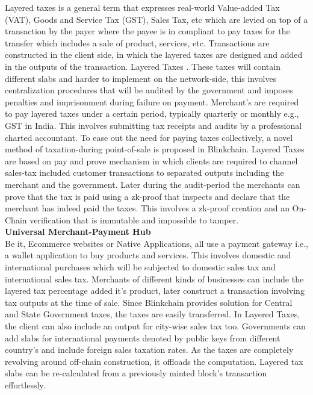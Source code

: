 \documentclass[letterpaper,11pt]{article}
\begin{document}
Layered taxes is a general term that expresses real-world Value-added Tax (VAT), Goods and Service Tax (GST), Sales Tax, etc which are levied on top of a transaction by the payer where the payee is in compliant to pay taxes for the transfer which includes a sale of product, services, etc. Transactions are constructed in the client side, in which the layered taxes are designed and added in the outputs of the transaction. Layered Taxes . These taxes will contain different slabs and harder to implement on the network-side, this involves centralization  procedures that will be audited by the government and imposes penalties and imprisonment during failure on payment. Merchant's are required to pay layered taxes under a certain period, typically quarterly or monthly e.g., GST in India. This involves submitting tax receipts and audits by a professional charted accountant. To ease out the need for paying taxes collectively, a novel method of taxation-during point-of-sale is proposed in Blinkchain. Layered Taxes are based on pay and prove mechanism in which clients are required to channel sales-tax included customer transactions to separated outputs including the merchant and the government. Later during the audit-period the merchants can prove that the tax is paid using a zk-proof that inspects and declare that the merchant has indeed paid the taxes. This involves a zk-proof creation and an On-Chain verification that is immutable and impossible to tamper.\\

\textbf{Universal Merchant-Payment Hub}\\

Be it, Ecommerce websites or Native Applications, all use a payment gateway i.e., a wallet application to buy products and services. This involves domestic and international purchases which will be subjected to domestic sales tax and international sales tax. Merchants of different kinds of businesses can include the layered tax percentage added it's product, later construct a transaction involving tax outputs at the time of sale. Since Blinkchain provides solution for Central and State Government taxes, the taxes are easily transferred. In Layered Taxes, the client can also include an output for city-wise sales tax too. Governments can add slabs for international payments denoted by public keys from different country's and include foreign sales taxation rates. As the taxes are completely revolving around off-chain construction, it offloads the computation. Layered tax slabs can be re-calculated from a previously minted block's transaction effortlessly.\\
\end{document}
